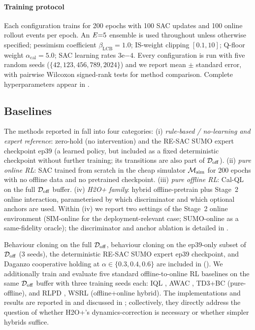 \paragraph{Training protocol}
Each configuration trains for 200 epochs with 100 SAC updates and 100 online rollout events per epoch.
An $E{=}5$ ensemble is used throughout unless otherwise specified; pessimism coefficient $\beta_{\text{LCB}}{=}1.0$; IS-weight clipping $[0.1, 10]$; Q-floor weight $\alpha_{\text{cal}}{=}5.0$; SAC learning rates $3\mathrm{e}{-4}$.
Every configuration is run with five random seeds ($\{42, 123, 456, 789, 2024\}$) and we report mean $\pm$ standard error, with pairwise Wilcoxon signed-rank tests for method comparison.
Complete hyperparameters appear in .

\subsection{Baselines}
\label{sec:exp:baselines}

The methods reported in  fall into four categories:
(i) \emph{rule-based / no-learning and expert reference}: zero-hold (no intervention) and the RE-SAC SUMO expert checkpoint ep39 (a learned policy, but included as a fixed deterministic checkpoint without further training; its transitions are also part of $\mathcal{D}_{\mathrm{off}}$).
(ii) \emph{pure online RL}: SAC trained from scratch in the cheap simulator $\mathcal{M}_{\mathrm{sim}}$ for 200 epochs with no offline data and no pretrained checkpoint.
(iii) \emph{pure offline RL}: Cal-QL on the full $\mathcal{D}_{\mathrm{off}}$ buffer.
(iv) \emph{H2O+ family}: hybrid offline-pretrain plus Stage~2 online interaction, parameterised by which discriminator and which optional anchors are used.
Within (iv) we report two settings of the Stage~2 online environment (SIM-online for the deployment-relevant case; SUMO-online as a same-fidelity oracle); the discriminator and anchor ablation is detailed in .

Behaviour cloning on the full $\mathcal{D}_{\mathrm{off}}$, behaviour cloning on the ep39-only subset of $\mathcal{D}_{\mathrm{off}}$ ($3$ seeds), the deterministic RE-SAC SUMO expert ep39 checkpoint, and Daganzo cooperative holding at $\alpha \in \{0.3, 0.4, 0.6\}$ \citep{daganzo2009headway, xuan2011dynamic} are included in  ().
We additionally train and evaluate five standard offline-to-online RL baselines on the same $\mathcal{D}_{\mathrm{off}}$ buffer with three training seeds each: IQL \citep{kostrikov2021offline}, AWAC \citep{nair2020awac}, TD3+BC \citep{fujimoto2021minimalist} (pure-offline), and RLPD \citep{ball2023efficient}, WSRL \citep{zhou2024wsrl} (offline+online hybrid). The implementations and results are reported in  and discussed in ; collectively, they directly address the question of whether H2O+'s dynamics-correction is necessary or whether simpler hybrids suffice.

